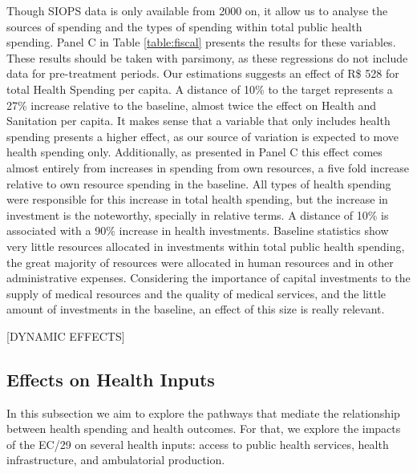








Though SIOPS data is only available from 2000 on, it allow us to analyse the sources of spending and the types of spending within total public health spending. Panel C in Table \ref{table:fiscal} presents the results for these variables. These results should be taken with parsimony, as these regressions do not include data for pre-treatment periods. Our estimations suggests an effect of R\$ 528 for total Health Spending per capita. A distance of 10\% to the target represents a 27\% increase relative to the baseline, almost twice the effect on Health and Sanitation per capita. It makes sense that a variable that only includes health spending presents a higher effect, as our source of variation is expected to move health spending only. Additionally, as presented in Panel C this effect comes almost entirely from increases in spending from own resources, a five fold increase relative to own resource spending in the baseline. All types of health spending were responsible for this increase in total health spending, but the increase in investment is the noteworthy, specially in relative terms. A distance of 10\% is associated with a 90\% increase in health investments. Baseline statistics show very little resources allocated in investments within total public health spending, the great majority of resources were allocated in human resources and in other administrative expenses. Considering the importance of capital investments to the supply of medical resources and the quality of medical services, and the little amount of investments in the baseline, an effect of this size is really relevant.

[DYNAMIC EFFECTS]






\subsection{Effects on Health Inputs}

In this subsection we aim to explore the pathways that mediate the relationship between health spending and health outcomes. For that, we explore the impacts of the EC/29 on several health inputs: access to public health services, health infrastructure, and ambulatorial production.

